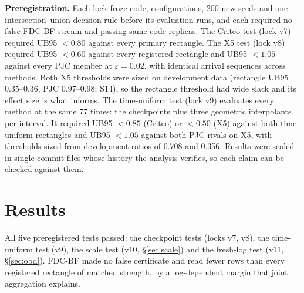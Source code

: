 \documentclass[sigconf,anonymous,review]{acmart}
\newcommand{\eps}{\varepsilon}
\begin{document}
\textbf{Preregistration.} Each lock froze code, configurations, 200 new seeds and one intersection--union decision rule before its evaluation runs, and each required no false FDC-BF stream and passing same-code replicas. The Criteo test (lock v7) required UB95 $< 0.80$ against every primary rectangle. The X5 test (lock v8) required UB95 $< 0.60$ against every registered rectangle and UB95 $< 1.05$ against every PJC member at $\eps = 0.02$, with identical arrival sequences across methods. Both X5 thresholds were sized on development data (rectangle UB95 0.35--0.36, PJC 0.97--0.98; S14), so the rectangle threshold had wide slack and its effect size is what informs. The time-uniform test (lock v9) evaluates every method at the same 77 times: the checkpoints plus three geometric interpolants per interval. It required UB95 $< 0.85$ (Criteo) or $< 0.50$ (X5) against both time-uniform rectangles and UB95 $< 1.05$ against both PJC rivals on X5, with thresholds sized from development ratios of 0.708 and 0.356. Results were sealed in single-commit files whose history the analysis verifies, so each claim can be checked against them.

\section{Results}\label{sec:results}

All five preregistered tests passed: the checkpoint tests (locks v7, v8), the time-uniform test (v9), the scale test (v10, \S\ref{sec:scale}) and the fresh-log test (v11, \S\ref{sec:obd}). FDC-BF made no false certificate and read fewer rows than every registered rectangle of matched strength, by a log-dependent margin that joint aggregation explains.
\end{document}
